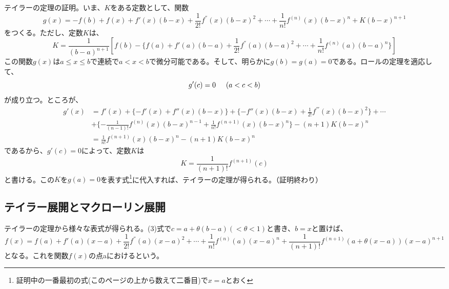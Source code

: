\documentclass[a4j,dvipdfmx]{jsarticle}
\begin{document}
テイラーの定理の証明。いま、$K$をある定数として、関数
\begin{equation*}
    g(x)=-f(b)+f(x)+f'(x)(b-x)+\frac{1}{2!}f^{''}(x)(b-x)^2+\cdots+\frac{1}{n!}f^{(n)}(x)(b-x)^n+K(b-x)^{n+1}
\end{equation*}
をつくる。ただし、定数$K$は、
\begin{equation*}
    K=\frac{1}{(b-a)^{n+1}}[f(b)-\{f(a)+f'(a)(b-a)+\frac{1}{2!}f^{''}(a)(b-a)^2+\cdots+\frac{1}{n!}f^{(n)}(a)(b-a)^n\}]
\end{equation*}
この関数$g(x)$は$a\leq x \leq b$で連続で$a<x<b$で微分可能である。そして、明らかに$g(b)=g(a)=0$である。ロールの定理を適応して、
\begin{equation*}
    g'(c)=0\hspace*{5mm}(a<c<b)
\end{equation*}
が成り立つ。ところが、
\begin{align*}
    g'(x)&=f'(x)+\{-f'(x)+f''(x)(b-x)\}+\{-f''(x)(b-x)+\frac{1}{2!}f^{'''}(x)(b-x)^2\}+\cdots\\
    &+\{-\frac{1}{(n-1)!}f^{(n)}(x)(b-x)^{n-1}+\frac{1}{n!}f^{(n+1)}(x)(b-x)^{n}\}-(n+1)K(b-x)^n\\
    &=\frac{1}{n!}f^{(n+1)}(x)(b-x)^{n}-(n+1)K(b-x)^n
\end{align*}
であるから、$g'(c)=0$によって、定数$K$は
\begin{equation*}
    K=\frac{1}{(n+1)!}f^{(n+1)}(c)
\end{equation*}
と書ける。この$K$を$g(a)=0$を表す式\footnote{証明中の一番最初の式(このページの上から数えて二番目)で$x=a$とおく}に代入すれば、テイラーの定理が得られる。（証明終わり）
\newpage
\subsection{テイラー展開とマクローリン展開}
テイラーの定理から様々な表式が得られる。(3)式で$c=a+\theta(b-a)(<\theta<1)$と書き、$b=x$と置けば、
\begin{equation}
    f(x)=f(a)+f'(a)(x-a)+\frac{1}{2!}f^{''}(a)(x-a)^2+\cdots+\frac{1}{n!}f^{(n)}(a)(x-a)^n+\frac{1}{(n+1)!}f^{(n+1)}(a+\theta(x-a))(x-a)^{n+1}
\end{equation}
となる。これを関数$f(x)$の点aにおけるという。
\end{document}
